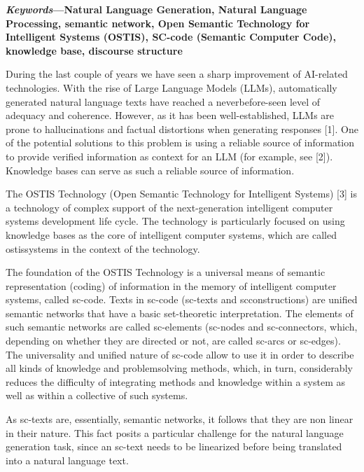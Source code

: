 \documentclass{scndocument}
\begin{document}
\begin{SCn}
\begin{multicols}{2}
\begin{spacing}{0.65}
\begin{justify}
{\textbf{\textit{Keywords}—Natural Language Generation, Natural Language Processing, semantic network, Open Semantic Technology for Intelligent Systems (OSTIS), SC-code (Semantic Computer Code), knowledge base, discourse structure}}
\end{justify}
\end{spacing}
\setlength{\parindent}{1em}
\begin{justify}
During the last couple of years we have seen a sharp improvement of AI-related technologies. With the rise of Large Language Models (LLMs), automatically generated natural language texts have reached a neverbefore-seen level of adequacy and coherence. However, as it has been well-established, LLMs are prone to hallucinations and factual distortions when generating responses [1]. One of the potential solutions to this problem is using a reliable source of information to provide verified information as context for an LLM (for example, see [2]). Knowledge bases can serve as such a reliable source of information.\par
The OSTIS Technology (Open Semantic Technology for Intelligent Systems) [3] is a technology of complex support of the next-generation intelligent computer systems development life cycle. The technology is particularly focused on using knowledge bases as the core of intelligent computer systems, which are called ostissystems in the context of the technology.\par 
\columnbreak The foundation of the OSTIS Technology is a universal means of semantic representation (coding) of information in the memory of intelligent computer systems, called sc-code. Texts in sc-code (sc-texts and scconstructions) are unified semantic networks that have a basic set-theoretic interpretation. The elements of such semantic networks are called sc-elements (sc-nodes and sc-connectors, which, depending on whether they are directed or not, are called sc-arcs or sc-edges). The universality and unified nature of sc-code allow to use it in order to describe all kinds of knowledge and problemsolving methods, which, in turn, considerably reduces the difficulty of integrating methods and knowledge within a system as well as within a collective of such systems.\par
As sc-texts are, essentially, semantic networks, it follows that they are non
linear in their nature. This fact posits a particular challenge for the natural language generation task, since an sc-text needs to be linearized before being translated into a natural language text.\par 

\end{justify}
\end{multicols}
\end{SCn}
\end{document}
